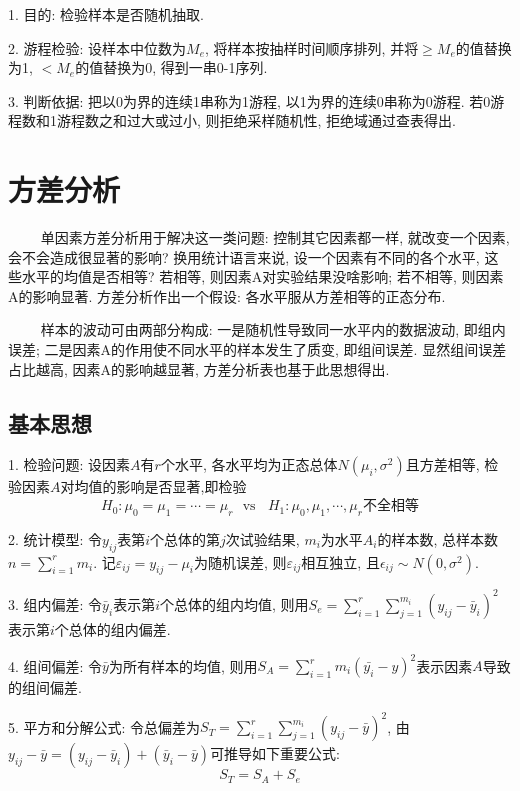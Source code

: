 1. 目的: 检验样本是否随机抽取.

2. 游程检验: 设样本中位数为$M_e$, 将样本按抽样时间顺序排列, 并将$\geq M_e$的值替换为1, $<M_e$的值替换为0, 得到一串0-1序列.

3. 判断依据: 把以0为界的连续1串称为1游程, 以1为界的连续0串称为0游程. 若0游程数和1游程数之和过大或过小, 则拒绝采样随机性, 拒绝域通过查表得出.

\section{方差分析}
\begin{tcolorbox}[colback=red!5,colframe=red!75!black]
    ~~~~ 单因素方差分析用于解决这一类问题: 控制其它因素都一样, 就改变一个因素, 会不会造成很显著的影响? 换用统计语言来说, 设一个因素有不同的各个水平, 这些水平的均值是否相等? 若相等, 则因素A对实验结果没啥影响; 若不相等, 
    则因素A的影响显著. 方差分析作出一个假设: 各水平服从方差相等的正态分布.

    ~~~~ 样本的波动可由两部分构成: 一是随机性导致同一水平内的数据波动, 即组内误差; 二是因素A的作用使不同水平的样本发生了质变, 即组间误差. 显然组间误差占比越高, 因素A的影响越显著, 方差分析表也基于此思想得出.
\end{tcolorbox}

\subsection{基本思想}

1. 检验问题: 设因素$A$有$r$个水平, 各水平均为正态总体$N(\mu_i,\sigma^2)$且方差相等, 检验因素$A$对均值的影响是否显著,即检验
\begin{equation*}
    H_0: \mu_0=\mu_1=\cdots=\mu_r ~~~\text{vs}~~~~H_1:\mu_0,\mu_1,\cdots,\mu_r \text{不全相等}
\end{equation*}

2. 统计模型: 令$y_{ij}$表第$i$个总体的第$j$次试验结果, $m_i$为水平$A_i$的样本数, 总样本数$n=\sum\limits_{i=1}^r m_i$. 
记$\varepsilon_{ij}=y_{ij}-\mu_i$为随机误差, 则$\varepsilon_{ij}$相互独立, 且$\epsilon_{ij}\sim N(0,\sigma^2)$.

3. 组内偏差: 令$\bar{y}_i$表示第$i$个总体的组内均值, 则用$S_e=\sum\limits_{i=1}^r\sum\limits_{j=1}^{m_i}(y_{ij}-\bar{y}_i)^2$表示第$i$个总体的组内偏差.

4. 组间偏差: 令$\bar{y}$为所有样本的均值, 则用$S_A=\sum\limits_{i=1}^r m_i(\bar{y_i}-y)^2$表示因素$A$导致的组间偏差.

5. 平方和分解公式: 令总偏差为$S_T=\sum\limits_{i=1}^r\sum\limits_{j=1}^{m_i} (y_{ij}-\bar{y})^2$, 由$y_{ij}-\bar{y}=(y_{ij}-\bar{y}_i)+(\bar{y}_i-\bar{y})$可推导如下重要公式:
\begin{equation*}
    S_T=S_A+S_e
\end{equation*}


